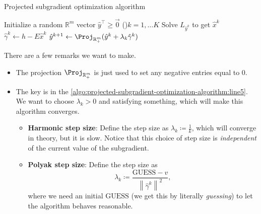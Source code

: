 \begin{algorithm}[H]\label{algo:projected-subgradient-optimization-algorithm}
	\DontPrintSemicolon{}
	\caption{Projected subgradient optimization algorithm}
	\BlankLine

	Initialize a random \(\mathbb{R} ^m\) vector \(\hat{y}^{\top}\geq \vec{0}\)\;
	\For(){\(k = 1, \dots K\)}{
		Solve \(L_{\hat{y}^k}\) to get \(\hat{x}^k\)\;
		\(\hat{\gamma}^k \gets h - E \hat{x}^k\)\;
		\(\hat{y}^{k+1} \gets \Proj_{\mathbb{R}^m_+}(\hat{y}^k + \lambda_{k}\hat{\gamma}^k) \)\;\label{algo:projected-subgradient-optimization-algorithm:line5}
	}
	\;
\end{algorithm}

\begin{remark}
	There are a few remarks we want to make.
	\begin{itemize}
		\item The projection \(\Proj_{\mathbb{R}^m_+}\) is just used to set any negative entries equal to \(0\).
		\item The key is in the \autoref{algo:projected-subgradient-optimization-algorithm:line5}. We want to choose \(\lambda_{k}>0\) and satisfying something, which will make this algorithm converges.
		      \begin{itemize}
			      \item \textbf{Harmonic step size}: Define the step size as \(\lambda_{k}\coloneqq \frac{1}{k}\), which will converge in theory, but it is slow. Notice that this choice of step size is \emph{independent} of the current value of the subgradient.
			      \item \textbf{Polyak step size}: Define the step size as
			            \[
				            \lambda_{k}\coloneqq \frac{\mathrm{GUESS} - v}{\left\lVert \hat{\gamma}^k\right\rVert^2 },
			            \]
			            where we need an initial \(\mathrm{GUESS}\) (we get this by literally \emph{guessing}) to let the algorithm behaves reasonable.
		      \end{itemize}
	\end{itemize}
\end{remark}